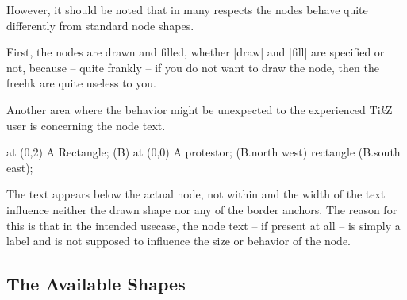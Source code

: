 \documentclass{ltxdoc}
\newcommand{\tikzname}{Ti\emph{k}Z\xspace}
\begin{document}
However, it should be noted that in many respects the nodes behave quite differently from standard node shapes.

First, the nodes are drawn and filled, whether |draw| and |fill| are specified or not, because -- quite frankly -- if you do not want to draw the node, then the \textsf{freehk} are quite useless to you.

Another area where the behavior might be unexpected to the experienced \tikzname user is concerning the node text.
	
\begin{codeexample}{3cm}
\node[draw,rectangle,minimum size=1.5cm] at (0,2) {A Rectangle};
\node[protestor,minimum size=1.5cm] (B) at (0,0) {A protestor};
 (B.north west) rectangle (B.south east);
\end{codeexample}

	The text appears below the actual node, not within and the width of the text influence neither the drawn shape nor any of the border anchors.
	The reason for this is that in the intended usecase, the node text -- if present at all -- is simply a label and is not supposed to influence the size or behavior of the node.
%	
%	
%
\subsection{The Available Shapes}
\end{document}
